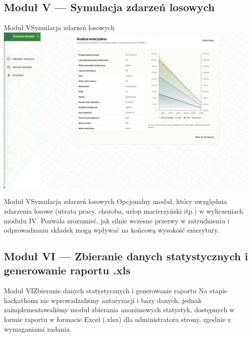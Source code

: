\subsection{Moduł V --- Symulacja zdarzeń losowych}

\begin{frame}[t]{Moduł V}{Symulacja zdarzeń losowych}
  \includegraphics[width=.8\textwidth]{img/module_4_extended_pension_calculator}
\end{frame}

\begin{frame}[t]{Moduł V}{Symulacja zdarzeń losowych}
Opcjonalny moduł, który uwzględnia zdarzenia losowe (utrata pracy, choroba, urlop macierzyński itp.)
w wyliczeniach modułu IV.
\pause
Pozwala zrozumieć, jak silnie wczesne przerwy w zatrudnieniu i odprowadzaniu składek
mogą wpływać na końcową wysokość emerytury.
\end{frame}

\subsection{Moduł VI --- Zbieranie danych statystycznych i generowanie raportu .xls}

\begin{frame}[t]{Moduł VI}{Zbieranie danych statystycznych i generowanie raportu}
Na etapie hackathonu nie wprowadzaliśmy autoryzacji i bazy danych,
jednak zaimplementowaliśmy moduł zbierania anonimowych statystyk,
dostępnych w formie raportu w formacie Excel (.xlsx) dla administratora strony,
zgodnie z wymaganiami zadania.
\end{frame}